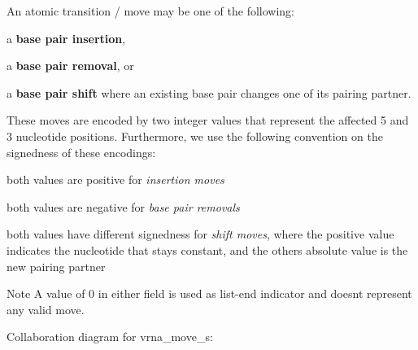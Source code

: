 An atomic transition / move may be one of the following\+:
\begin{DoxyItemize}
\item a {\bfseries{base pair insertion}},
\item a {\bfseries{base pair removal}}, or
\item a {\bfseries{base pair shift}} where an existing base pair changes one of its pairing partner.
\end{DoxyItemize}

These moves are encoded by two integer values that represent the affected 5\textquotesingle{} and 3\textquotesingle{} nucleotide positions. Furthermore, we use the following convention on the signedness of these encodings\+:
\begin{DoxyItemize}
\item both values are positive for {\itshape insertion moves}
\item both values are negative for {\itshape base pair removals}
\item both values have different signedness for {\itshape shift moves}, where the positive value indicates the nucleotide that stays constant, and the others absolute value is the new pairing partner
\end{DoxyItemize}

\begin{DoxyNote}{Note}
A value of 0 in either field is used as list-\/end indicator and doesn\textquotesingle{}t represent any valid move. 
\end{DoxyNote}


Collaboration diagram for vrna\+\_\+move\+\_\+s\+:
